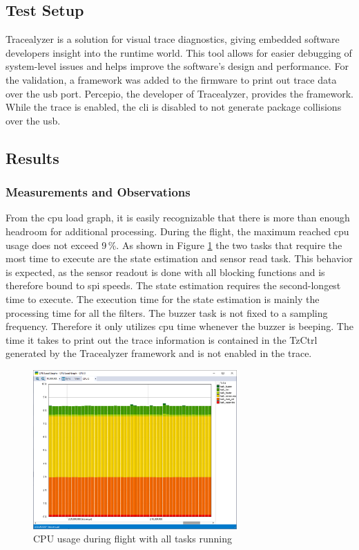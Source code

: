 \subsection{Test Setup}
Tracealyzer is a solution for visual trace diagnostics, giving embedded software developers insight into the runtime world. This tool allows for easier debugging of system-level issues and helps improve the software's design and performance. For the validation, a framework was added to the firmware to print out trace data over the \acrshort{usb} port. Percepio, the developer of Tracealyzer, provides the framework. While the trace is enabled, the \acrshort{cli} is disabled to not generate package collisions over the \acrshort{usb}.

\subsection{Results}
\subsubsection{Measurements and Observations}
From the \acrshort{cpu} load graph, it is easily recognizable that there is more than enough headroom for additional processing. During the flight, the maximum reached \acrshort{cpu} usage does not exceed 9\,\%. As shown in Figure \ref{fig:cpu-usage} the two tasks that require the most time to execute are the state estimation and sensor read task. This behavior is expected, as the sensor readout is done with all blocking functions and is therefore bound to \acrshort{spi} speeds. The state estimation requires the second-longest time to execute. The execution time for the state estimation is mainly the processing time for all the filters. The buzzer task is not fixed to a sampling frequency. Therefore it only utilizes \acrshort{cpu} time whenever the buzzer is beeping. The time it takes to print out the trace information is contained in the TzCtrl generated by the Tracealyzer framework and is not enabled in the trace.  

\begin{figure}[h!]
    \centering
	\includegraphics[width=7.8cm]{images/cpu-usage}
	\caption{CPU usage during flight with all tasks running}
	\label{fig:cpu-usage}
\end{figure}

